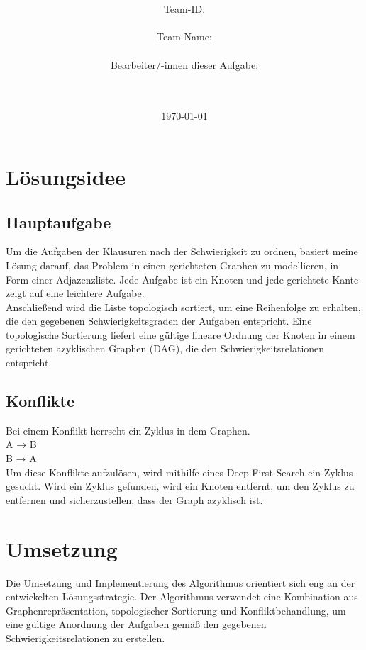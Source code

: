 \documentclass[a4paper,10pt,ngerman]{scrartcl}
\title{\textbf{\Huge\Aufgabe}}
\author{\LARGE Team-ID: \LARGE \TeamId \\\\
	    \LARGE Team-Name: \LARGE \TeamName \\\\
	    \LARGE Bearbeiter/-innen dieser Aufgabe: \\ 
	    \LARGE \Namen\\\\}
\date{\LARGE\today}
\begin{document}
\maketitle

\newpage
\tableofcontents

\vspace{0.5cm}

\newpage

\section{Lösungsidee}
\subsection{Hauptaufgabe}
Um die Aufgaben der Klausuren nach der Schwierigkeit zu ordnen, basiert meine Lösung darauf, das Problem in einen gerichteten Graphen zu modellieren, in Form einer Adjazenzliste. Jede Aufgabe ist ein Knoten und jede gerichtete Kante zeigt auf eine leichtere Aufgabe.
\\
Anschließend wird die Liste topologisch sortiert, um eine Reihenfolge zu erhalten, die den gegebenen Schwierigkeitsgraden der Aufgaben entspricht. Eine topologische Sortierung liefert eine gültige lineare Ordnung der Knoten in einem gerichteten azyklischen Graphen (DAG), die den Schwierigkeitsrelationen entspricht.

\subsection{Konflikte}
Bei einem Konflikt herrscht ein Zyklus in dem Graphen.\\
A → B\\
B → A\\
Um diese Konflikte aufzulösen, wird mithilfe eines Deep-First-Search ein Zyklus gesucht. Wird ein Zyklus gefunden, wird ein Knoten entfernt, um den Zyklus zu entfernen und sicherzustellen, dass der Graph azyklisch ist.

\section{Umsetzung}
Die Umsetzung und Implementierung des Algorithmus orientiert sich eng an der entwickelten Lösungsstrategie. Der Algorithmus verwendet eine Kombination aus Graphenrepräsentation, topologischer Sortierung und Konfliktbehandlung, um eine gültige Anordnung der Aufgaben gemäß den gegebenen Schwierigkeitsrelationen zu erstellen.
\end{document}
